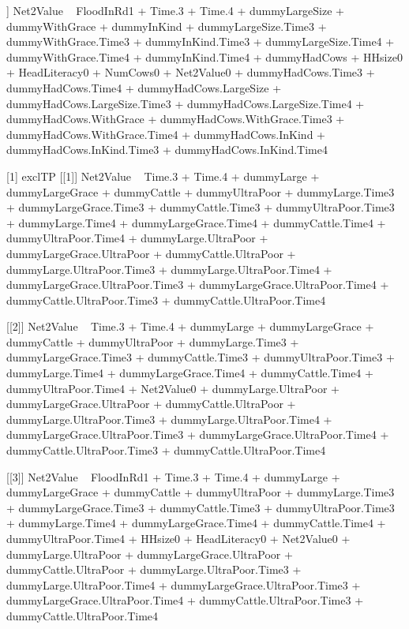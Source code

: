 \begin{Schunk}
\begin{Soutput}
[[6]]
Net2Value ~ FloodInRd1 + Time.3 + Time.4 + dummyLargeSize + dummyWithGrace + 
    dummyInKind + dummyLargeSize.Time3 + dummyWithGrace.Time3 + 
    dummyInKind.Time3 + dummyLargeSize.Time4 + dummyWithGrace.Time4 + 
    dummyInKind.Time4 + dummyHadCows + HHsize0 + HeadLiteracy0 + 
    NumCows0 + Net2Value0 + dummyHadCows.Time3 + dummyHadCows.Time4 + 
    dummyHadCows.LargeSize + dummyHadCows.LargeSize.Time3 + dummyHadCows.LargeSize.Time4 + 
    dummyHadCows.WithGrace + dummyHadCows.WithGrace.Time3 + dummyHadCows.WithGrace.Time4 + 
    dummyHadCows.InKind + dummyHadCows.InKind.Time3 + dummyHadCows.InKind.Time4

[1] exclTP
[[1]]
Net2Value ~ Time.3 + Time.4 + dummyLarge + dummyLargeGrace + 
    dummyCattle + dummyUltraPoor + dummyLarge.Time3 + dummyLargeGrace.Time3 + 
    dummyCattle.Time3 + dummyUltraPoor.Time3 + dummyLarge.Time4 + 
    dummyLargeGrace.Time4 + dummyCattle.Time4 + dummyUltraPoor.Time4 + 
    dummyLarge.UltraPoor + dummyLargeGrace.UltraPoor + dummyCattle.UltraPoor + 
    dummyLarge.UltraPoor.Time3 + dummyLarge.UltraPoor.Time4 + 
    dummyLargeGrace.UltraPoor.Time3 + dummyLargeGrace.UltraPoor.Time4 + 
    dummyCattle.UltraPoor.Time3 + dummyCattle.UltraPoor.Time4

[[2]]
Net2Value ~ Time.3 + Time.4 + dummyLarge + dummyLargeGrace + 
    dummyCattle + dummyUltraPoor + dummyLarge.Time3 + dummyLargeGrace.Time3 + 
    dummyCattle.Time3 + dummyUltraPoor.Time3 + dummyLarge.Time4 + 
    dummyLargeGrace.Time4 + dummyCattle.Time4 + dummyUltraPoor.Time4 + 
    Net2Value0 + dummyLarge.UltraPoor + dummyLargeGrace.UltraPoor + 
    dummyCattle.UltraPoor + dummyLarge.UltraPoor.Time3 + dummyLarge.UltraPoor.Time4 + 
    dummyLargeGrace.UltraPoor.Time3 + dummyLargeGrace.UltraPoor.Time4 + 
    dummyCattle.UltraPoor.Time3 + dummyCattle.UltraPoor.Time4

[[3]]
Net2Value ~ FloodInRd1 + Time.3 + Time.4 + dummyLarge + dummyLargeGrace + 
    dummyCattle + dummyUltraPoor + dummyLarge.Time3 + dummyLargeGrace.Time3 + 
    dummyCattle.Time3 + dummyUltraPoor.Time3 + dummyLarge.Time4 + 
    dummyLargeGrace.Time4 + dummyCattle.Time4 + dummyUltraPoor.Time4 + 
    HHsize0 + HeadLiteracy0 + Net2Value0 + dummyLarge.UltraPoor + 
    dummyLargeGrace.UltraPoor + dummyCattle.UltraPoor + dummyLarge.UltraPoor.Time3 + 
    dummyLarge.UltraPoor.Time4 + dummyLargeGrace.UltraPoor.Time3 + 
    dummyLargeGrace.UltraPoor.Time4 + dummyCattle.UltraPoor.Time3 + 
    dummyCattle.UltraPoor.Time4


\end{Soutput}
\end{Schunk}
